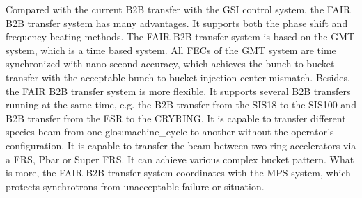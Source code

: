 Compared with the current B2B transfer with the GSI control system, the FAIR B2B transfer system has many advantages. It supports both the phase shift and frequency beating methods. 
The FAIR B2B transfer system is based on the GMT system, which is a time based system. All FECs of the GMT system are time synchronized with nano second accuracy, which achieves the bunch-to-bucket transfer with the acceptable bunch-to-bucket injection center mismatch. Besides, the FAIR B2B transfer system is more flexible. It supports several B2B transfers running at the same time, e.g. the B2B transfer from the SIS18 to the SIS100 and B2B transfer from the ESR to the CRYRING. It is capable to transfer different species beam from one \gls{glos:machine_cycle} to another without the operator's configuration. It is capable to transfer the beam between two ring accelerators via a \gls{FRS}, Pbar or Super FRS. It can achieve various complex bucket pattern. What is more, the FAIR B2B transfer system coordinates with the MPS system, which protects synchrotrons from unacceptable failure or situation. 


